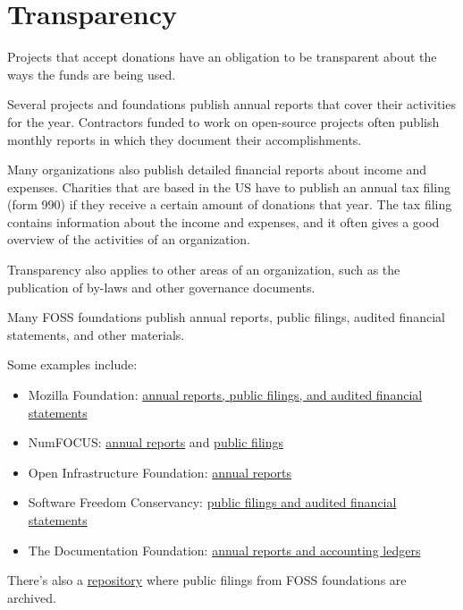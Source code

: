 


\chapter{Transparency}

Projects that accept donations have an obligation to be transparent about the ways the funds are being used.

Several projects and foundations publish annual reports that cover their activities for the year.  Contractors funded to work on open-source projects often publish monthly reports in which they document their accomplishments.

Many organizations also publish detailed financial reports about income and expenses.  Charities that are based in the US have to publish an annual tax filing (form 990) if they receive a certain amount of donations that year.  The tax filing contains information about the income and expenses, and it often gives a good overview of the activities of an organization.

Transparency also applies to other areas of an organization, such as the publication of by-laws and other governance documents.

\begin{kaobox}[frametitle=Transparency of FOSS foundations]

Many FOSS foundations publish annual reports, public filings, audited financial statements, and other materials.

Some examples include:

\begin{itemize}

\item Mozilla Foundation: \href{https://www.mozilla.org/en-US/foundation/annualreport}{annual reports, public filings, and audited financial statements}
\item NumFOCUS: \href{https://numfocus.org/community/mission/annual-reports}{annual reports} and \href{https://numfocus.org/legal}{public filings}
\item Open Infrastructure Foundation: \href{https://openinfra.dev/about/}{annual reports}
\item Software Freedom Conservancy: \href{https://sfconservancy.org/about/filings/}{public filings and audited financial statements}
\item The Documentation Foundation: \href{https://www.documentfoundation.org/foundation/financials/}{annual reports and accounting ledgers}

\end{itemize}

There's also a \href{https://gitlab.com/floss-foundations/npo-public-filings}{repository} where public filings from FOSS foundations are archived.

\end{kaobox}

